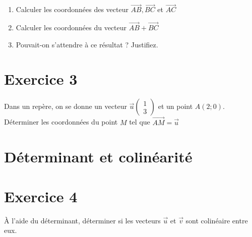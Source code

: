 \documentclass[french]{article}
\begin{document}
\begin{enumerate}
\item Calculer les coordonnées des vecteur $\overrightarrow{AB}, \overrightarrow{BC}$ et $\overrightarrow{AC}$
\item Calculer les coordonnées du vecteur $\overrightarrow{AB}+\overrightarrow{BC}$
\item Pouvait-on s'attendre à ce résultat ? Justifiez.
\end{enumerate}

\section*{Exercice 3}
Dans un repère, on se donne un vecteur $\overrightarrow{u} \left( \begin{array}{c}
1\\
3
\end{array} \right)$ et un point $A(2;0)$. Déterminer les coordonnées du point $M$ tel que $\overrightarrow{AM}=\overrightarrow{u}$

\section{Déterminant et colinéarité}
\section*{Exercice 4}
À l'aide du déterminant, déterminer si les vecteurs $\overrightarrow{u}$ et $\overrightarrow{v}$ sont colinéaire entre eux.
\end{document}
